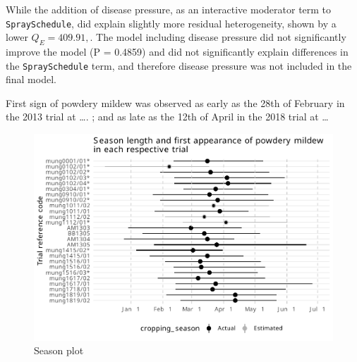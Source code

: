 \documentclass[agronomy,article,submit,moreauthors,pdftex]{mdpi}
\begin{document}
While the addition of disease pressure, as an interactive moderator term to \texttt{SpraySchedule}, did explain slightly more residual heterogeneity, shown by a lower \(Q_E = 409.91,\).
The model including disease pressure did not significantly improve the model (P = 0.4859) and did not significantly explain differences in the \texttt{SpraySchedule} term, and therefore disease pressure was not included in the final model.

First sign of powdery mildew was observed as early as the 28th of February in the 2013 trial at \ldots. ; and as late as the 12th of April in the 2018 trial at \ldots{}

\begin{figure}
\centering
\includegraphics{paper_files/figure-latex/Figure2-1.pdf}
\caption{\label{fig:Figure2}Season plot}
\end{figure}
\end{document}
